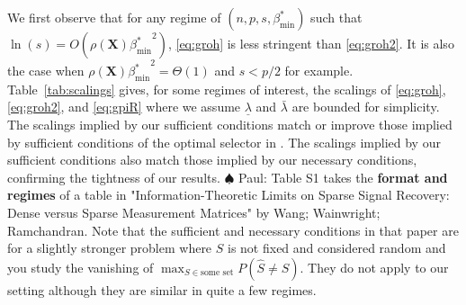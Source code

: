 \documentclass[bj,authoryear]{imsart}
\theoremstyle{plain}
\newcommand{\paul}[1]{{\small{\color{green} \sf $\spadesuit$ Paul: #1}}}
\newcommand{\bs}{\boldsymbol}
\begin{document}
We first observe that for any regime of $(n,p,s,\beta_{\min}^*)$ such that $\ln(s)=O(\rho(\bs X){\beta_{\min}^*}^2)$, \eqref{eq:groh} is less stringent than \eqref{eq:groh2}. It is also the case when $\rho(\bs X){\beta_{\min}^*}^2=\Theta(1)$ and $s<p/2$ for example. Table~\ref{tab:scalings} gives, for some regimes of interest, the scalings of \eqref{eq:groh}, \eqref{eq:groh2}, and \eqref{eq:gpiR} where we assume $\underline{\lambda}$ and $\bar{\lambda}$ are bounded for simplicity. The scalings implied by our sufficient conditions match or improve those implied by sufficient conditions of the optimal selector in \cite{infotheowainwright}. The scalings implied by our sufficient conditions also match those implied by our necessary conditions, confirming the tightness of our results. \paul{Table S1 takes the \textbf{format and regimes} of a table in "Information-Theoretic Limits on Sparse Signal Recovery: Dense versus Sparse Measurement Matrices" by Wang; Wainwright; Ramchandran. Note that the sufficient and necessary conditions in that paper are for a slightly stronger problem where $S$ is not fixed and considered random and you study the vanishing of $\max_{S \in \text{some set}}P(\hat{S}\neq S)$. They do not apply to our setting although they are similar in quite a few regimes.} 
\end{document}
